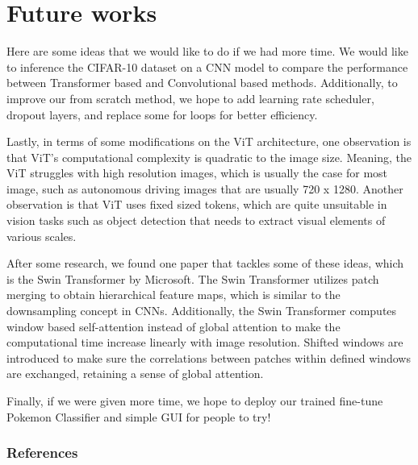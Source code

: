 \documentclass{article} %
\begin{document}
\section{Future works}
Here are some ideas that we would like to do if we had more time. We would like to inference 
the CIFAR-10 dataset on a CNN model to compare the performance between Transformer based and 
Convolutional based methods. Additionally, to improve our from scratch method, we hope to add 
learning rate scheduler, dropout layers, and replace some for loops for better efficiency.

Lastly, in terms of some modifications on the ViT architecture, one observation is that ViT's 
computational complexity is quadratic to the image size. Meaning, the ViT struggles with high 
resolution images, which is usually the case for most image, such as autonomous driving images 
that are usually 720 x 1280. Another observation is that ViT uses fixed sized tokens, which are 
quite unsuitable in vision tasks such as object detection that needs to extract visual elements 
of various scales.

After some research, we found one paper that tackles some of these ideas, which is the Swin 
Transformer by Microsoft. The Swin Transformer utilizes patch merging to obtain hierarchical 
feature maps, which is similar to the downsampling concept in CNNs. Additionally, the Swin 
Transformer computes window based self-attention instead of global attention to make the 
computational time increase linearly with image resolution. Shifted windows are introduced to 
make sure the correlations between patches within defined windows are exchanged, retaining a 
sense of global attention.

Finally, if we were given more time, we hope to deploy our trained fine-tune Pokemon Classifier 
and simple GUI for people to try!

\subsubsection*{References}
\end{document}
